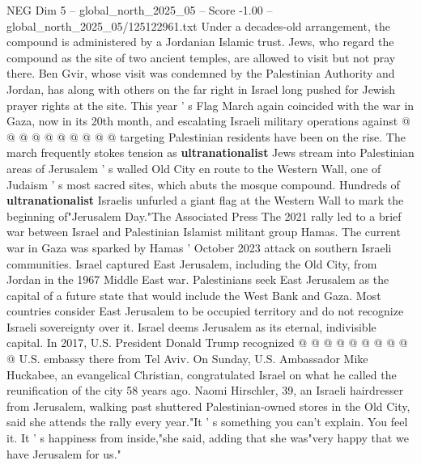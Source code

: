 \begin{textsample}{NEG Dim 5 – global\_north\_2025\_05 – Score -1.00 – global\_north\_2025\_05/125122961.txt}
Under a decades-old arrangement, the compound is administered by a Jordanian Islamic trust.
Jews, who regard the compound as the site of two ancient temples, are allowed to visit but not pray there.
Ben Gvir, whose visit was condemned by the Palestinian Authority and Jordan, has along with others on the far right in Israel long pushed for Jewish prayer rights at the site.
This year ' s Flag March again coincided with the war in Gaza, now in its 20th month, and escalating Israeli military operations against @ @ @ @ @ @ @ @ @ @ targeting Palestinian residents have been on the rise.
The march frequently stokes tension as \textbf{ultranationalist} Jews stream into Palestinian areas of Jerusalem ' s walled Old City en route to the Western Wall, one of Judaism ' s most sacred sites, which abuts the mosque compound.
Hundreds of \textbf{ultranationalist} Israelis unfurled a giant flag at the Western Wall to mark the beginning of"Jerusalem Day."The Associated Press The 2021 rally led to a brief war between Israel and Palestinian Islamist militant group Hamas.
The current war in Gaza was sparked by Hamas ' October 2023 attack on southern Israeli communities.
Israel captured East Jerusalem, including the Old City, from Jordan in the 1967 Middle East war.
Palestinians seek East Jerusalem as the capital of a future state that would include the West Bank and Gaza.
Most countries consider East Jerusalem to be occupied territory and do not recognize Israeli sovereignty over it.
Israel deems Jerusalem as its eternal, indivisible capital.
In 2017, U.S.
President Donald Trump recognized @ @ @ @ @ @ @ @ @ @ U.S. embassy there from Tel Aviv.
On Sunday, U.S.
Ambassador Mike Huckabee, an evangelical Christian, congratulated Israel on what he called the reunification of the city 58 years ago.
Naomi Hirschler, 39, an Israeli hairdresser from Jerusalem, walking past shuttered Palestinian-owned stores in the Old City, said she attends the rally every year."It ' s something you can't explain.
You feel it.
It ' s happiness from inside,"she said, adding that she was"very happy that we have Jerusalem for us."

\end{textsample}
